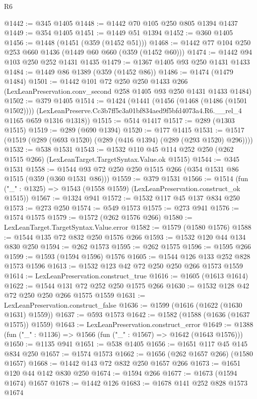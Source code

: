 \begin{lexlean}{R6}
\begin{coremodule}
@1442 := @345 @1405
@1448 := @1442 @70 @105 @250 @805 @1394 @1437
@1449 := @354 @1405
@1451 := @1449 @51 @1394
@1452 := @360 @1405
@1456 := @1448 (@1451 (@359 (@1452 @51)))
@1468 := @1442 @77 @104 @250 @253 @660 @1436 (@1449 @60 @660 (@359 (@1452 @60)))
@1474 := @1442 @94 @103 @250 @252 @1431 @1435
@1479 := @1367 @1405 @93 @250 @1431 @1433
@1484 := @1449 @86 @1389 (@359 (@1452 @86))
@1486 := @1474 (@1479 @1484)
@1501 := @1442
    @101
    @72
    @250
    @250
    @1433
    @266
    (LexLeanPreservation.conv_second @258 @1405 @93 @250 @1431 @1433 @1484)
@1502 := @379 @1405
@1514 := @1424
    (@1441
      (@1456 (@1468 (@1486 (@1501 @1502))))
      (LexLeanPreserve.Cc3b7ff5c3a01bf834aed9f5bfd4073a4.R6.__rel_4 @1165 @659 @1316 @1318))
@1515 := @514 @1417
@1517 := @289 (@1303 @1515)
@1519 := @289 (@690 @1394)
@1520 := @177 @1415
@1531 := @1517 (@1519 (@289 (@693 @1520) (@289 (@416 @1394) (@289 (@293 @1520) @296))))
@1532 := @538 @1531
@1543 := @1532 @110 @45 @114 @252 @250 (@262 @1515 @266) (LexLeanTarget.TargetSyntax.Value.ok @1515)
@1544 := @345 @1531
@1558 := @1544 @93 @72 @250 @250 @1515 @266 (@354 @1531 @86 @1515 (@359 (@360 @1531 @86)))
@1559 := @379 @1531
@1566 := @1514 (fun ("_" : @1325) => @1543 (@1558 @1559) (LexLeanPreservation.construct_ok @1515))
@1567 := @1324 @941
@1572 := @1532 @117 @45 @137 @834 @250
@1573 := @273 @250
@1574 := @549 @1573
@1575 := @273 @941
@1576 := @1574 @1575
@1579 := @1572 (@262 @1576 @266)
@1580 := LexLeanTarget.TargetSyntax.Value.error
@1582 := @1579 (@1580 @1576)
@1588 := @1544 @135 @72 @832 @250 @1576 @266
@1593 := @1532 @120 @44 @134 @830 @250
@1594 := @262 @1573
@1595 := @262 @1575
@1596 := @1595 @266
@1599 := @1593 (@1594 @1596) @1576
@1605 := @1544 @126 @133 @252 @828 @1573 @1596
@1613 := @1532 @123 @42 @72 @250 @250 @266 @1573 @1559
@1614 := LexLeanPreservation.construct_true
@1616 := @1605 (@1613 @1614)
@1622 := @1544 @131 @72 @252 @250 @1575 @266
@1630 := @1532 @128 @42 @72 @250 @250 @266 @1575 @1559
@1631 := LexLeanPreservation.construct_false
@1636 := @1599 (@1616 (@1622 (@1630 @1631) @1559))
@1637 := @593 @1573
@1642 := @1582 (@1588 (@1636 (@1637 @1575)) @1559)
@1643 := LexLeanPreservation.construct_error
@1649 := @1388 (fun ("_" : @1136) => @1566 (fun ("_" : @1567) => @1642 (@1643 @1576)))
@1650 := @1135 @941
@1651 := @538 @1405
@1656 := @1651 @117 @45 @145 @834 @250
@1657 := @1574 @1573
@1662 := @1656 (@262 @1657 @266) (@1580 @1657)
@1668 := @1442 @143 @72 @832 @250 @1657 @266
@1673 := @1651 @120 @44 @142 @830 @250
@1674 := @1594 @266
@1677 := @1673 (@1594 @1674) @1657
@1678 := @1442 @126
@1683 := @1678 @141 @252 @828 @1573 @1674

\end{coremodule}
\end{lexlean}
